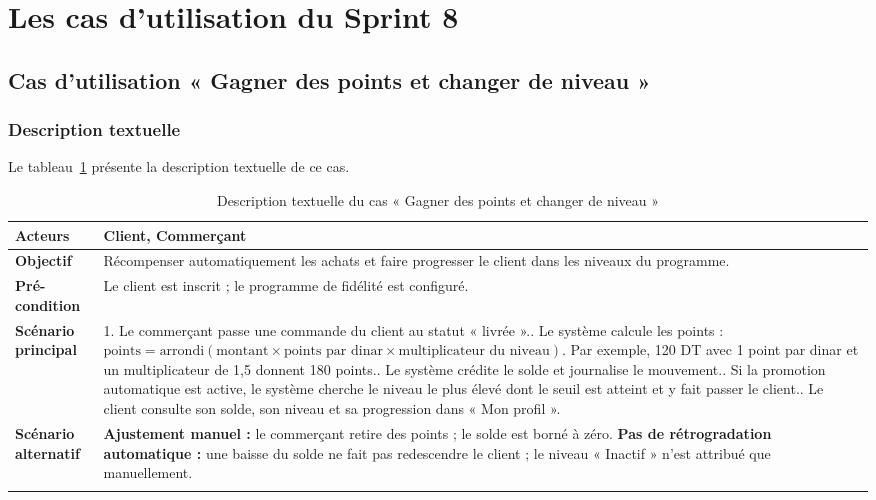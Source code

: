 \section{Les cas d'utilisation du Sprint 8}
\subsection{Cas d'utilisation « Gagner des points et changer de niveau »}
\subsubsection{Description textuelle}
Le tableau~\ref{tab:uc-fidelite} présente la description textuelle de ce cas.
\renewcommand{\arraystretch}{1.5}
\begin{longtable}{|p{4cm}|p{11cm}|}
\hline
\textbf{Acteurs} & Client, Commerçant \\
\hline
\textbf{Objectif} & Récompenser automatiquement les achats et faire progresser le client dans les niveaux du programme. \\
\hline
\textbf{Pré-condition} & Le client est inscrit ; le programme de fidélité est configuré. \\
\hline
\textbf{Scénario principal} &
1. Le commerçant passe une commande du client au statut « livrée ».\newline
2. Le système calcule les points : $\text{points} = \text{arrondi}(\text{montant} \times \text{points par dinar} \times \text{multiplicateur du niveau})$. Par exemple, 120 DT avec 1 point par dinar et un multiplicateur de 1,5 donnent 180 points.\newline
3. Le système crédite le solde et journalise le mouvement.\newline
4. Si la promotion automatique est active, le système cherche le niveau le plus élevé dont le seuil est atteint et y fait passer le client.\newline
5. Le client consulte son solde, son niveau et sa progression dans « Mon profil ». \\
\hline
\textbf{Scénario alternatif} &
\textbf{Ajustement manuel :} le commerçant retire des points ; le solde est borné à zéro.\newline
\textbf{Pas de rétrogradation automatique :} une baisse du solde ne fait pas redescendre le client ; le niveau « Inactif » n'est attribué que manuellement. \\
\hline
\caption{Description textuelle du cas « Gagner des points et changer de niveau »}
\label{tab:uc-fidelite}
\end{longtable}

